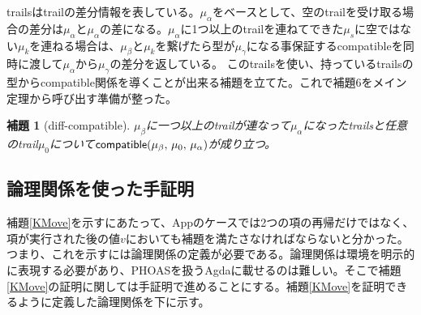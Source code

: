 \documentclass[japanese,draft]{jssst_ppl} %
\newtheorem{lemma}[definition]{補題}
\begin{document}
trailsはtrailの差分情報を表している。$\mu_{\alpha}$をベースとして、空のtrailを受け取る場合の差分は$\mu_{\alpha}$と$\mu_{\alpha}$の差になる。$\mu_{\alpha}$に1つ以上のtrailを連ねてできた$\mu_s$に空ではない$\mu_k$を連ねる場合は、$\mu_{\beta}$と$\mu_k$を繋げたら型が$\mu_{\gamma}$になる事保証する\textsf{compatible}を同時に渡して$\mu_{\alpha}$から$\mu_{\gamma}$の差分を返している。
このtrailsを使い、持っているtrailsの型から\textsf{compatible}関係を導くことが出来る補題を立てた。これで補題6をメイン定理から呼び出す準備が整った。
\begin{lemma}[diff-compatible]
  $\mu_{\beta}$に一つ以上のtrailが連なって$\mu_{\alpha}$になったtrailsと任意のtrail$\mu_0$について$\textsf{compatible}(\mu_{\beta},\,\mu_0,\,\mu_{\alpha})$が成り立つ。
\end{lemma}


\subsection{論理関係を使った手証明}
補題\ref{KMove}を示すにあたって、Appのケースでは2つの項の再帰だけではなく、項が実行された後の値$v$においても補題を満たさなければならないと分かった。つまり、これを示すには論理関係の定義が必要である。論理関係は環境を明示的に表現する必要があり、PHOASを扱うAgdaに載せるのは難しい。そこで補題\ref{KMove}の証明に関しては手証明で進めることにする。補題\ref{KMove}を証明できるように定義した論理関係を下に示す。
\end{document}
